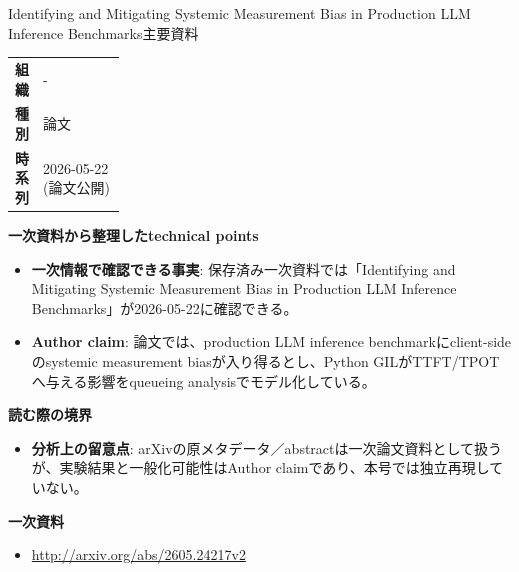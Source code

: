 \begin{technicalnote}{Identifying and Mitigating Systemic Measurement Bias in Production LLM Inference Benchmarks}{主要資料}
\begingroup
\begin{tabularx}{\linewidth}{@{}>{\bfseries}p{0.22\linewidth}X@{}}
組織 & - \\
種別 & 論文 \\
時系列 & 2026-05-22 (論文公開) \\
\end{tabularx}
\smallskip
{\bfseries 一次資料から整理したtechnical points}
\begin{itemize}[leftmargin=1.5em,itemsep=0.35em]
\item \textbf{一次情報で確認できる事実}: 保存済み一次資料では「Identifying and Mitigating Systemic Measurement Bias in Production LLM Inference Benchmarks」が2026-05-22に確認できる。
\item \textbf{Author claim}: 論文では、production LLM inference benchmarkにclient-sideのsystemic measurement biasが入り得るとし、Python GILがTTFT/TPOTへ与える影響をqueueing analysisでモデル化している。
\end{itemize}
{\bfseries 読む際の境界}
\begin{itemize}[leftmargin=1.5em,itemsep=0.35em]
\item \textbf{分析上の留意点}: arXivの原メタデータ／abstractは一次論文資料として扱うが、実験結果と一般化可能性はAuthor claimであり、本号では独立再現していない。
\end{itemize}
\begin{samepage}
{\bfseries 一次資料}
\begingroup\sloppy
\begin{itemize}[leftmargin=1.5em,itemsep=0.25em]
\item {\scriptsize\url{http://arxiv.org/abs/2605.24217v2}}
\end{itemize}
\endgroup
\end{samepage}
\endgroup
\end{technicalnote}
\medskip


